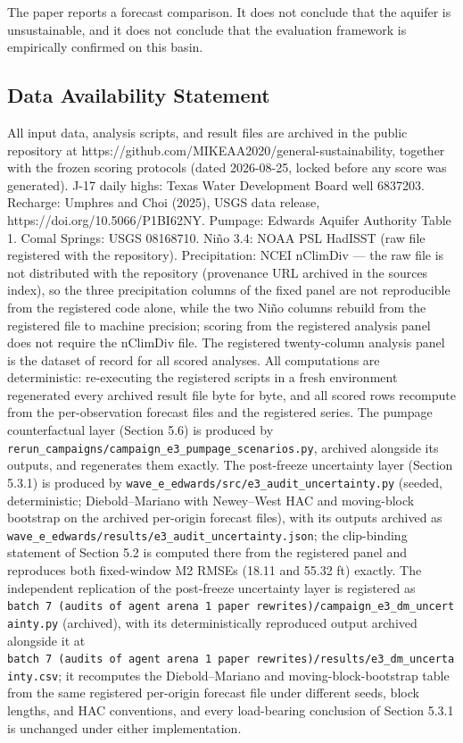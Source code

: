 \documentclass[11pt]{article}
\begin{document}
The paper reports a forecast comparison. It does not conclude that the
aquifer is unsustainable, and it does not conclude that the evaluation
framework is empirically confirmed on this basin.

\subsection{Data Availability
Statement}\label{data-availability-statement}

All input data, analysis scripts, and result files are archived in the
public repository at
https://github.com/MIKEAA2020/general-sustainability, together with the
frozen scoring protocols (dated 2026-08-25, locked before any score was
generated). J-17 daily highs: Texas Water Development Board well
6837203. Recharge: Umphres and Choi (2025), USGS data release,
https://doi.org/10.5066/P1BI62NY. Pumpage: Edwards Aquifer Authority
Table 1. Comal Springs: USGS 08168710. Niño 3.4: NOAA PSL HadISST (raw
file registered with the repository). Precipitation: NCEI nClimDiv ---
the raw file is not distributed with the repository (provenance URL
archived in the sources index), so the three precipitation columns of
the fixed panel are not reproducible from the registered code alone,
while the two Niño columns rebuild from the registered file to machine
precision; scoring from the registered analysis panel does not require
the nClimDiv file. The registered twenty-column analysis panel is the
dataset of record for all scored analyses. All computations are
deterministic: re-executing the registered scripts in a fresh
environment regenerated every archived result file byte for byte, and
all scored rows recompute from the per-observation forecast files and
the registered series. The pumpage counterfactual layer (Section 5.6) is
produced by
\texttt{rerun\_campaigns/campaign\_e3\_pumpage\_scenarios.py}, archived
alongside its outputs, and regenerates them exactly. The post-freeze
uncertainty layer (Section 5.3.1) is produced by
\texttt{wave\_e\_edwards/src/e3\_audit\_uncertainty.py} (seeded,
deterministic; Diebold--Mariano with Newey--West HAC and moving-block
bootstrap on the archived per-origin forecast files), with its outputs
archived as
\texttt{wave\_e\_edwards/results/e3\_audit\_uncertainty.json}; the
clip-binding statement of Section 5.2 is computed there from the
registered panel and reproduces both fixed-window M2 RMSEs (18.11 and
55.32 ft) exactly. The independent replication of the post-freeze
uncertainty layer is registered as
\texttt{batch\ 7\ (audits\ of\ agent\ arena\ 1\ paper\ rewrites)/campaign\_e3\_dm\_uncertainty.py}
(archived), with its deterministically reproduced output archived
alongside it at
\texttt{batch\ 7\ (audits\ of\ agent\ arena\ 1\ paper\ rewrites)/results/e3\_dm\_uncertainty.csv};
it recomputes the Diebold--Mariano and moving-block-bootstrap table from
the same registered per-origin forecast file under different seeds,
block lengths, and HAC conventions, and every load-bearing conclusion of
Section 5.3.1 is unchanged under either implementation.
\end{document}

